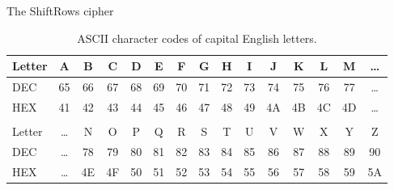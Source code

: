\documentclass{practice}
\begin{document}
\begin{task}{The ShiftRows cipher}
  \begin{table}[h!]
    \centering
    \begin{tabular}{@{}lcccccccccccccc@{}}
      Letter & A  & B  & C  & D  & E  & F  & G  & H  & I  & J  & K  & L  & M & \dots\\\midrule
      DEC & 65 & 66 & 67 & 68 & 69 & 70 & 71 & 72 & 73 & 74 & 75 & 76 & 77 & \dots\\
      HEX & 41 & 42 & 43 & 44 & 45 & 46 & 47 & 48 & 49 & 4A & 4B & 4C & 4D & \dots\\\\
      Letter & \dots & N  & O  & P  & Q  & R  & S  & T  & U  & V  & W  & X  & Y  & Z\\\midrule
      DEC & \dots & 78 & 79 & 80 & 81 & 82 & 83 & 84 & 85 & 86 & 87 & 88 & 89 & 90\\
      HEX & \dots & 4E & 4F & 50 & 51 & 52 & 53 & 54 & 55 & 56 & 57 & 58 & 59 & 5A
    \end{tabular}
    \caption{ASCII character codes of capital English letters.}
  \end{table}
\end{task}
\end{document}
